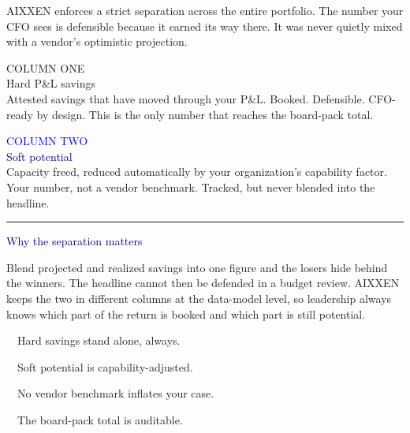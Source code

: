 \documentclass[10pt]{article}
\newcommand{\bodysize}{\fontsize{9.6}{15.2}\selectfont}
\newcommand{\body}[1]{{\bodysize\textcolor{ink}{#1}\par}}
\newcommand{\checkitem}[1]{\textcolor{blue}{\ding{52}}~~{\bodysize\textcolor{ink}{#1}}\par\vspace{4.5pt}}
\begin{document}
\body{AIXXEN enforces a strict separation across the entire portfolio. The number your CFO sees is defensible because it earned its way there. It was never quietly mixed with a vendor's optimistic projection.}
\vspace{18pt}

\begin{minipage}[t]{0.485\textwidth}
\begin{navyblock}
{\semibold\fontsize{8}{8}\selectfont\textcolor{midblue}{COLUMN ONE}}\\[5pt]
{\heavy\fontsize{12.5}{15}\selectfont Hard P\&L savings}\\[6pt]
{\fontsize{8.8}{13}\selectfont\textcolor{linegray}{Attested savings that have moved through your P\&L. Booked. Defensible. CFO-ready by design. This is the only number that reaches the board-pack total.}}
\end{navyblock}
\end{minipage}\hfill
\begin{minipage}[t]{0.485\textwidth}
\begin{outblock}
{\semibold\fontsize{8}{8}\selectfont\textcolor{blue}{COLUMN TWO}}\\[5pt]
{\heavy\fontsize{12.5}{15}\selectfont\textcolor{navy}{Soft potential}}\\[6pt]
{\fontsize{8.8}{13}\selectfont\textcolor{slate}{Capacity freed, reduced automatically by your organization's capability factor. Your number, not a vendor benchmark. Tracked, but never blended into the headline.}}
\end{outblock}
\end{minipage}

\vspace{20pt}
{\color{linegray}\rule{\textwidth}{0.7pt}}
\vspace{16pt}

{\heavy\fontsize{12}{15}\selectfont\textcolor{navy}{Why the separation matters}}\par
\vspace{8pt}
\body{Blend projected and realized savings into one figure and the losers hide behind the winners. The headline cannot then be defended in a budget review. AIXXEN keeps the two in different columns at the data-model level, so leadership always knows which part of the return is booked and which part is still potential.}
\vspace{14pt}

\begin{minipage}[t]{0.49\textwidth}
\checkitem{Hard savings stand alone, always.}
\checkitem{Soft potential is capability-adjusted.}
\end{minipage}\hfill
\begin{minipage}[t]{0.49\textwidth}
\checkitem{No vendor benchmark inflates your case.}
\checkitem{The board-pack total is auditable.}
\end{minipage}
\newpage
\end{document}
